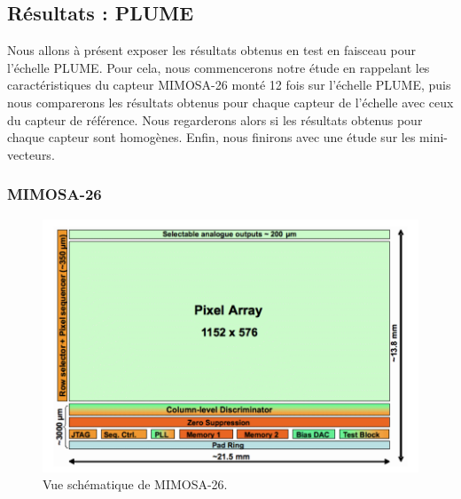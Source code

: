 \subsection{R\'esultats : PLUME}

  Nous allons \`a pr\'esent exposer les r\'esultats obtenus en test en faisceau pour l'\'echelle PLUME. Pour cela, nous commencerons notre \'etude en rappelant les caract\'eristiques du capteur MIMOSA-26 mont\'e 12 fois sur l'\'echelle PLUME, puis nous comparerons les r\'esultats obtenus pour chaque capteur de l'\'echelle avec ceux du capteur de r\'ef\'erence. Nous regarderons alors si les r\'esultats obtenus pour chaque capteur sont homog\`enes. Enfin, nous finirons avec une \'etude sur les mini-vecteurs.
  
  \subsubsection{MIMOSA-26}
  
  \begin{figure}[!htb]
   \begin{center} 
    \includegraphics[scale=0.30]{./figures/schema_Mi26.png}
    \caption{Vue sch\'ematique de MIMOSA-26.}
    \label{fig:schema_Mi26}
   \end{center}
  \end{figure}
   
